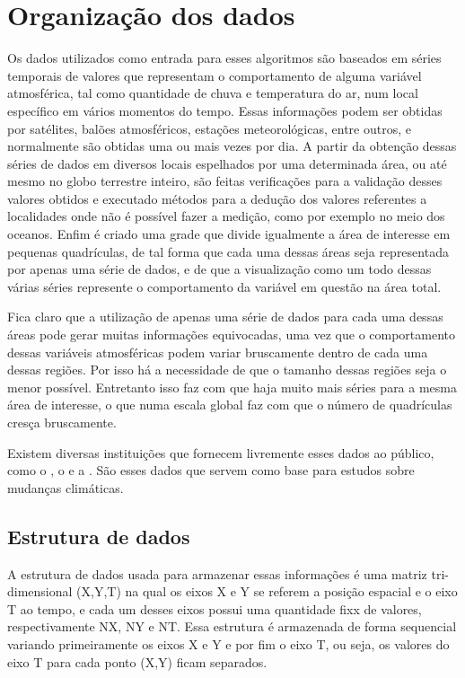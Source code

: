 \chapter{Organização dos dados}

Os dados utilizados como entrada para esses algoritmos são baseados em séries temporais de valores que representam o comportamento de alguma variável atmosférica, tal como quantidade de chuva e temperatura do ar, num local específico em vários momentos do tempo. Essas informações podem ser obtidas por satélites, balões atmosféricos, estações meteorológicas, entre outros, e normalmente são obtidas uma ou mais vezes por dia. A partir da obtenção dessas séries de dados em diversos locais espelhados por uma determinada área, ou até mesmo no globo terrestre inteiro, são feitas verificações para a validação desses valores obtidos e executado métodos para a dedução dos valores referentes a localidades onde não é possível fazer a medição, como por exemplo no meio dos oceanos. Enfim é criado uma grade que divide igualmente a área de interesse em pequenas quadrículas, de tal forma que cada uma dessas áreas seja representada por apenas uma série de dados, e de que a visualização como um todo dessas várias séries represente o comportamento da variável em questão na área total. 

Fica claro que a utilização de apenas uma série de dados para cada uma dessas áreas pode gerar muitas informações equivocadas, uma vez que o comportamento dessas variáveis atmosféricas podem variar bruscamente dentro de cada uma dessas regiões. Por isso há a necessidade de que o tamanho dessas regiões seja o menor possível. Entretanto isso faz com que haja muito mais séries para a mesma área de interesse, o que numa escala global faz com que o número de quadrículas cresça bruscamente.

Existem diversas instituições que fornecem livremente esses dados ao público, como o \cite{NOAA}, o \cite{MOHC} e a \cite{NASA}. São esses dados que servem como base para estudos sobre mudanças climáticas.

\section{Estrutura de dados}

A estrutura de dados usada para armazenar essas informações é uma matriz tri-dimensional (X,Y,T) na qual os eixos X e Y se referem a posição espacial e o eixo T ao tempo, e cada um desses eixos possui uma quantidade fixx de valores, respectivamente NX, NY e NT. Essa estrutura é armazenada de forma sequencial variando primeiramente os eixos X e Y e por fim o eixo T, ou seja, os valores do eixo T para cada ponto (X,Y) ficam separados.

